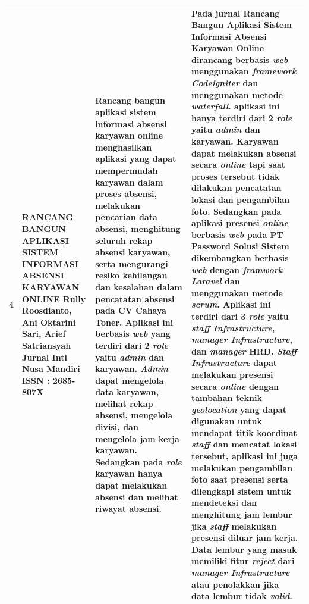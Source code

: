 \begin{longtable}{ |p{0.5cm}|p{3cm}|p{7cm}|p{12cm}|  }
  4 & RANCANG BANGUN APLIKASI SISTEM INFORMASI ABSENSI KARYAWAN ONLINE
 \newline Rully Roosdianto, Ani Oktarini Sari, Arief Satriansyah
 \newline Jurnal Inti Nusa Mandiri
 \newline ISSN : 2685-807X
 & Rancang bangun aplikasi sistem informasi absensi karyawan online menghasilkan aplikasi yang dapat mempermudah karyawan dalam proses absensi, melakukan pencarian data absensi, menghitung seluruh rekap absensi karyawan, serta mengurangi resiko kehilangan dan kesalahan dalam pencatatan absensi pada CV Cahaya Toner. Aplikasi ini berbasis \textit{web} yang terdiri dari 2 \textit{role} yaitu \textit{admin} dan karyawan. \textit{Admin} dapat mengelola data karyawan, melihat rekap absensi, mengelola divisi, dan mengelola jam kerja karyawan. Sedangkan pada \textit{role} karyawan hanya dapat melakukan absensi dan melihat riwayat absensi.
 & Pada jurnal Rancang Bangun Aplikasi Sistem Informasi Absensi Karyawan Online dirancang berbasis \textit{web} menggunakan \textit{framework Codeigniter} dan menggunakan metode \textit{waterfall}. aplikasi ini hanya terdiri dari 2 \textit{role} yaitu \textit{admin} dan karyawan. Karyawan dapat melakukan absensi secara \textit{online} tapi saat proses tersebut tidak dilakukan pencatatan lokasi dan pengambilan foto.
 \newline 
  \newline
  Sedangkan pada aplikasi presensi \textit{online} berbasis \textit{web} pada PT Password Solusi Sistem dikembangkan berbasis \textit{web} dengan \textit{framwork Laravel} dan menggunakan metode \textit{scrum}. Aplikasi ini terdiri dari 3 \textit{role} yaitu \textit{staff Infrastructure}, \textit{manager Infrastructure}, dan \textit{manager} HRD. \textit{Staff Infrastructure} dapat melakukan presensi secara \textit{online} dengan tambahan teknik \textit{geolocation} yang dapat digunakan untuk mendapat titik koordinat \textit{staff} dan mencatat lokasi tersebut, aplikasi ini juga melakukan pengambilan foto saat presensi serta dilengkapi sistem untuk mendeteksi dan menghitung jam lembur jika \textit{staff} melakukan presensi diluar jam kerja. Data lembur yang masuk memiliki fitur \textit{reject} dari \textit{manager Infrastructure} atau penolakkan jika data lembur tidak \textit{valid}.
 \\ \hline


\end{longtable}
